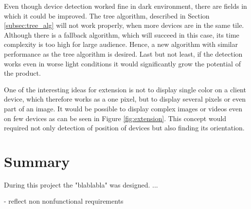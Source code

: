 Even though device detection worked fine in dark environment, there are fields in which it could be improved.
The tree algorithm, described in Section \ref{subsec:tree_alg} will not work properly, when more devices are in the same tile.
Although there is a fallback algorithm, which will succeed in this case, its time complexity is too high for large audience.
Hence, a new algorithm with similar performance as the tree algorithm is desired.
Last but not least, if the detection works even in worse light conditions it would significantly grow the potential of the product.

One of the interesting ideas for extension is not to display single color on a client device, which therefore works as a one pixel, but to display several pixels or even part of an image.
It would be possible to display complex images or videos even on few devices as can be seen in Figure \ref{fig:extension}.
This concept would required not only detection of position of devices but also finding its orientation.

\section{Summary}

During this project the "blablabla" was designed. ...


- reflect non nonfunctional requirements